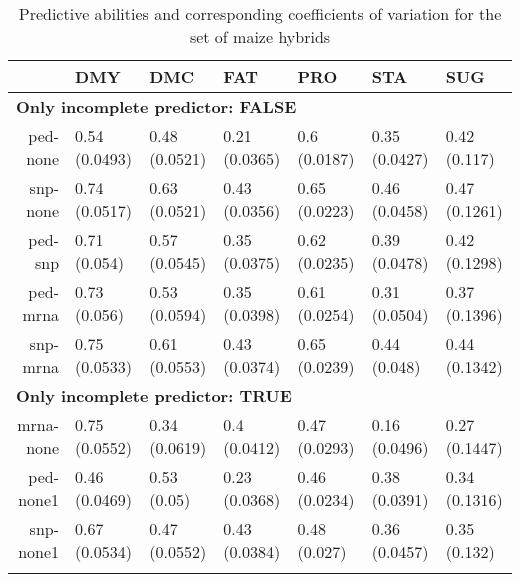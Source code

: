 \documentclass[]{elsarticle} %
\begin{document}
\begin{table}[ht]
\centering
\caption{Predictive abilities and corresponding coefficients of variation for the set of maize hybrids} 
\begin{tabular}{rllllll}
  \toprule
 & DMY & DMC & FAT & PRO & STA & SUG \\ 
  \midrule
\multicolumn{6}{l}{{\bfseries Only incomplete predictor: FALSE}}\\
ped-none & 0.54 (0.0493) & 0.48 (0.0521) & 0.21 (0.0365) & 0.6 (0.0187) & 0.35 (0.0427) & 0.42 (0.117) \\ 
  snp-none & 0.74 (0.0517) & 0.63 (0.0521) & 0.43 (0.0356) & 0.65 (0.0223) & 0.46 (0.0458) & 0.47 (0.1261) \\ 
  ped-snp & 0.71 (0.054) & 0.57 (0.0545) & 0.35 (0.0375) & 0.62 (0.0235) & 0.39 (0.0478) & 0.42 (0.1298) \\ 
  ped-mrna & 0.73 (0.056) & 0.53 (0.0594) & 0.35 (0.0398) & 0.61 (0.0254) & 0.31 (0.0504) & 0.37 (0.1396) \\ 
  snp-mrna & 0.75 (0.0533) & 0.61 (0.0553) & 0.43 (0.0374) & 0.65 (0.0239) & 0.44 (0.048) & 0.44 (0.1342) \\ 
   \midrule
\multicolumn{6}{l}{{\bfseries Only incomplete predictor: TRUE}}\\
mrna-none & 0.75 (0.0552) & 0.34 (0.0619) & 0.4 (0.0412) & 0.47 (0.0293) & 0.16 (0.0496) & 0.27 (0.1447) \\ 
  ped-none1 & 0.46 (0.0469) & 0.53 (0.05) & 0.23 (0.0368) & 0.46 (0.0234) & 0.38 (0.0391) & 0.34 (0.1316) \\ 
  snp-none1 & 0.67 (0.0534) & 0.47 (0.0552) & 0.43 (0.0384) & 0.48 (0.027) & 0.36 (0.0457) & 0.35 (0.132) \\ 
   \bottomrule
\multicolumn{6}{l}{}\\
\end{tabular}
\end{table}
\end{document}
